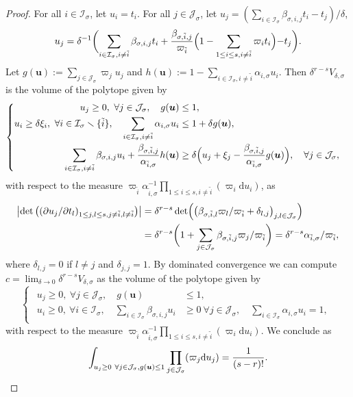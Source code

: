 \documentclass[JEP,XML,SOM,Unicode,published]{cedram}
\newcommand{\bfu}{\boldsymbol{u}}
\newcommand{\ii}[1]{\mathcal{J}_{#1}}
\newcommand{\ic}[1]{\mathcal{I}_{#1}}
\theoremstyle{definition}
\numberwithin{theorem}{section}
\begin{document}
\begin{proof}
For all $i\in\ic{\sigma}$, let $u_i=t_i$.
For all $j\in\ii{\sigma}$, let $u_j=\left(\sum_{i\in\ic{\sigma}} \beta_{\sigma, i,j}t_i -t_j \right)/\delta$, \ie \[
u_j
= \delta^{-1}\biggl(\sum_{i\in\ic{\sigma},i\neq\tilde i} \beta_{\sigma, i,j}t_i
+\frac{\beta_{\sigma,\tilde i , j}}{\varpi_{\tilde i}}
\Bigl(1- \sum_{1\leq i\leq s, i\neq \tilde i} \varpi_i t_i \Bigl) -t_j \biggr).
\]
Let $g(\bfu):=\sum_{j\in\ii{\sigma}}\varpi_j u_j$
and $h(\bfu):= 1-\sum_{i\in\ic{\sigma},i\neq \tilde i} \alpha_{i,\sigma}u_i$.
Then $\delta^{r-s}V_{\delta, \sigma}$ is the volume of the polytope given by
\[
\begin{cases}
\begin{aligned}
u_j\geq0, \ \forall j\in\ii{\sigma},
\quad
g(\bfu) &\leq 1,
\\
u_i\geq \delta\xi_i ,\ \forall i\in\ic{\sigma}\smallsetminus\{\tilde i\},
\quad
\sum_{ i\in\ic{\sigma},i\neq\tilde i} \alpha_{i,\sigma} u_i &\leq 1+\delta g(\bfu),
\\
\sum_{i\in\ic{\sigma}, i\neq\tilde i}\beta_{\sigma,i,j}u_i
+\frac{\beta_{\sigma,\tilde i,j}}{\alpha_{\tilde i,\sigma}}
h(\bfu)
&\geq \delta \Bigl(u_j+\xi_j-\frac{\beta_{\sigma,\tilde i,j}}{\alpha_{\tilde i,\sigma}} g(\bfu) \Bigr), \quad\forall j\in\ii{\sigma}, 
\end{aligned}
\end{cases}
\]
with respect to the measure
$\varpi_{\tilde i}\alpha_{\tilde i,\sigma}^{-1}
\prod_{1\leq i\leq s, i\neq\tilde i}(\varpi_i\mathrm du_i)$, as
\begin{align*}
\left|\det\left((\partial u_j/\partial t_l)_{1\leq j,l\leq s, j\neq\tilde i,l\neq\tilde i}\right)\right|
&=\delta^{r-s}\det\Bigl(\bigl(\beta_{\sigma, \tilde i, l}\varpi_l/\varpi_{\tilde i} + \delta_{l,j}\bigr)_{j,l\in\ii{\sigma}}\Bigr)\\
&=\delta^{r-s} \biggl(1+ \sum_{j\in\ii{\sigma}}\beta_{\sigma, \tilde i, j}\varpi_j/\varpi_{\tilde i} \biggr)
= \delta^{r-s}\alpha_{\tilde i,\sigma}/\varpi_{\tilde i},
\end{align*}
where $\delta_{l,j}=0$ if $l\neq j$ and $\delta_{j,j}=1$.
By dominated convergence
we can compute $c=\lim_{\delta\to 0}\delta^{r-s}V_{\delta, \sigma}$
as the volume of the polytope given by
\[
\begin{cases}
\begin{aligned}
u_j\geq0, \ \forall j\in\ii{\sigma},\quad
g(\bfu)&\leq 1, \\
u_i\geq0, \ \forall i\in\ic{\sigma},
\quad \sum_{i\in\ic{\sigma}}\beta_{\sigma,i,j}u_i&\geq 0 \ \forall j\in\ii{\sigma},
\quad \sum_{i\in\ic{\sigma}}\alpha_{i,\sigma}u_i=1,
\end{aligned}
\end{cases}
\]
with respect to the measure
$\varpi_{\tilde i}\alpha_{\tilde i,\sigma}^{-1}\prod_{1\leq i\leq s, i\neq\tilde i}(\varpi_i\mathrm du_i)$.
We conclude as
\[
\int_{u_j\geq0 \ \forall j\in\ii{\sigma}, g(\bfu)\leq 1}
\prod_{j\in\ii{\sigma}}(\varpi_j\mathrm d u_j)
=\frac{1}{(s-r)!}.
\qedhere
\]
\end{proof}
\end{document}
